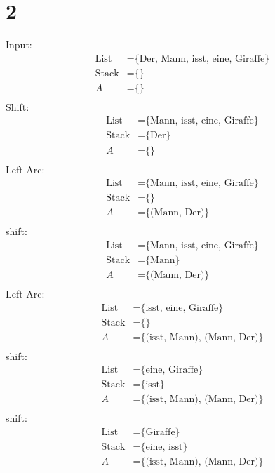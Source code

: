 \documentclass[a4paper,11pt,fleqn]{scrartcl}
\begin{document}
\section*{2}
Input:
\begin{align}
	\text{List} &= \text{\{Der, Mann, isst, eine, Giraffe\}} \\ %
	\text{Stack} &= \text{\{\}} \\
	A &= \text{\{\}} \\	
\end{align}
Shift:
\begin{align}
	\text{List} &= \text{\{Mann, isst, eine, Giraffe\}} \\ 
	\text{Stack} &= \text{\{Der\}} \\
	A &= \text{\{\}} \\	
\end{align}
Left-Arc:
\begin{align}
	\text{List} &= \text{\{Mann, isst, eine, Giraffe\}} \\ 
	\text{Stack} &= \text{\{\}} \\
	A &= \text{\{(Mann, Der)\}} \\	
\end{align}
shift:
\begin{align}
	\text{List} &= \text{\{Mann, isst, eine, Giraffe\}} \\ 
	\text{Stack} &= \text{\{Mann\}} \\
	A &= \text{\{(Mann, Der)\}} \\	
\end{align}
Left-Arc:
\begin{align}
	\text{List} &= \text{\{isst, eine, Giraffe\}} \\ 
	\text{Stack} &= \text{\{\}} \\
	A &= \text{\{(isst, Mann), (Mann, Der)\}} \\	
\end{align}
shift:
\begin{align}
	\text{List} &= \text{\{eine, Giraffe\}} \\ 
	\text{Stack} &= \text{\{isst\}} \\
	A &= \text{\{(isst, Mann), (Mann, Der)\}} \\	
\end{align}
shift:
\begin{align}
	\text{List} &= \text{\{Giraffe\}} \\ 
	\text{Stack} &= \text{\{eine, isst\}} \\
	A &= \text{\{(isst, Mann), (Mann, Der)\}} \\	
\end{align}
\end{document}

